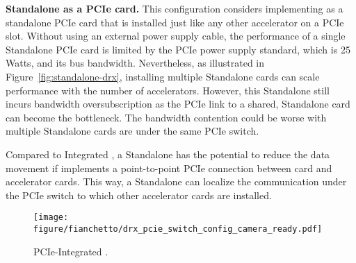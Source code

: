 \noindent\textbf{Standalone \drx as a PCIe card.}
This configuration considers implementing \drx as a standalone PCIe card that is installed just like any other accelerator on a PCIe slot. 
%
%
Without using an external power supply cable, the performance of a single Standalone \drx PCIe card is limited by the PCIe power supply standard, which is 25 Watts, and its bus bandwidth.
%
Nevertheless, as illustrated in Figure~\ref{fig:standalone-drx}, installing multiple Standalone \drx cards can scale \drx performance with the number of accelerators. 
%
However, this Standalone \drx still incurs bandwidth oversubscription as the PCIe link to a shared, Standalone \drx card can become the bottleneck.
%
The bandwidth contention could be worse with multiple Standalone \drx cards are under the same PCIe switch. 
%

Compared to Integrated \drx, a Standalone \drx has the potential to reduce the data movement if \dmx implements a point-to-point PCIe connection between \drx card and accelerator cards. This way, a Standalone \drx can localize the communication under the PCIe switch to which other accelerator cards are installed. 

\begin{figure}[ht!]
    \centering
    \texttt{[image: figure/fianchetto/drx\_pcie\_switch\_config\_camera\_ready.pdf]}
    \caption{PCIe-Integrated \drx.} 
    \label{fig:drx-config-on-pcie-switch}
\end{figure}

